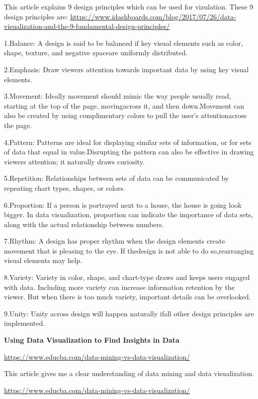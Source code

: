 \documentclass[]{book}
\theoremstyle{definition}
\theoremstyle{definition}
\theoremstyle{definition}
\theoremstyle{remark}
\begin{document}
\citep{data-insights}

This article explains 9 design principles which can be used for
vizulation. These 9 design principles are:
\url{https://www.idashboards.com/blog/2017/07/26/data-visualization-and-the-9-fundamental-design-principles/}

1.Balance: A design is said to be balanced if key visual elements such
as color, shape, texture, and negative spaceare uniformly distributed.

2.Emphasis: Draw viewers attention towards important data by using key
visual elements.

3.Movement: Ideally movement should mimic the way people usually read,
starting at the top of the page, movingacross it, and then down.Movement
can also be created by using complimentary colors to pull the user's
attentionacross the page.

4.Pattern: Patterns are ideal for displaying similar sets of
information, or for sets of data that equal in value.Disrupting the
pattern can also be effective in drawing viewers attention; it naturally
draws curiosity.

5.Repetition: Relationships between sets of data can be communicated by
repeating chart types, shapes, or colors.

6.Proportion: If a person is portrayed next to a house, the house is
going look bigger. In data visualization, proportion can indicate the
importance of data sets, along with the actual relationship between
numbers.

7.Rhythm: A design has proper rhythm when the design elements create
movement that is pleasing to the eye. If thedesign is not able to do
so,rearranging visual elements may help.

8.Variety: Variety in color, shape, and chart-type draws and keeps users
engaged with data. Including more variety can increase information
retention by the viewer. But when there is too much variety, important
details can be overlooked.

9.Unity: Unity across design will happen naturally ifall other design
principles are implemented.

\textbf{Using Data Visualization to Find Insights in Data}

\url{https://www.educba.com/data-mining-vs-data-visualization/}

This article gives me a clear understanding of data mining and data
visualization.

\url{https://www.educba.com/data-mining-vs-data-visualization/}
\end{document}
